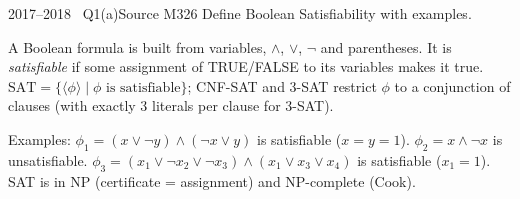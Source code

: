 \documentclass[11pt,a4paper]{article}
\begin{document}
\begin{question}{2017--2018 \textbullet\ Q1(a)}{Source M32}{6}
Define Boolean Satisfiability with examples.
\end{question}
\begin{solution}
A Boolean formula is built from variables, $\wedge$, $\vee$, $\neg$ and parentheses. It is \emph{satisfiable} if some assignment of TRUE/FALSE to its variables makes it true. $\mathrm{SAT}=\{\langle\phi\rangle\mid\phi\text{ is satisfiable}\}$; CNF-SAT and 3-SAT restrict $\phi$ to a conjunction of clauses (with exactly 3 literals per clause for 3-SAT).

Examples: $\phi_1=(x\vee\neg y)\wedge(\neg x\vee y)$ is satisfiable ($x=y=1$). $\phi_2=x\wedge\neg x$ is unsatisfiable. $\phi_3=(x_1\vee\neg x_2\vee\neg x_3)\wedge(x_1\vee x_3\vee x_4)$ is satisfiable ($x_1=1$). SAT is in NP (certificate = assignment) and NP-complete (Cook).
\end{solution}
\end{document}
